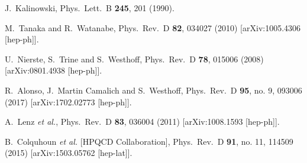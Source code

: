 \documentclass[prd,preprint,superscriptaddress,amsmath,amssymb]{revtex4}
\begin{document}
\begin{thebibliography}{100}
  

  J.~Kalinowski,
  Phys.\ Lett.\ B {\bf 245}, 201 (1990).

  

  M.~Tanaka and R.~Watanabe,
  Phys.\ Rev.\ D {\bf 82}, 034027 (2010)
  [arXiv:1005.4306 [hep-ph]].

  
  U.~Nierste, S.~Trine and S.~Westhoff,
  Phys.\ Rev.\ D {\bf 78}, 015006 (2008)
  [arXiv:0801.4938 [hep-ph]].



  R.~Alonso, J.~Martin Camalich and S.~Westhoff,
  Phys.\ Rev.\ D {\bf 95}, no. 9, 093006 (2017)
  [arXiv:1702.02773 [hep-ph]].



  


  A.~Lenz {\it et al.},
  Phys.\ Rev.\ D {\bf 83}, 036004 (2011)
  [arXiv:1008.1593 [hep-ph]].

  B.~Colquhoun {\it et al.} [HPQCD Collaboration],
  Phys.\ Rev.\ D {\bf 91}, no. 11, 114509 (2015)
  [arXiv:1503.05762 [hep-lat]].



\end{thebibliography}
\end{document}
